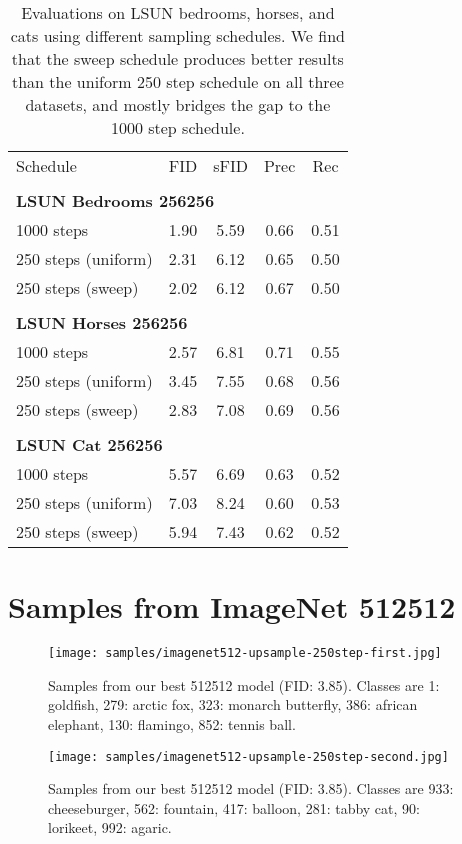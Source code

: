 \documentclass{article}
\begin{document}
\begin{table}[h]
    \begin{center}
    \begin{small}
    \begin{tabular}[t]{lcccc}
    \toprule
    Schedule & FID & sFID & Prec & Rec \\
    \\
    \multicolumn{5}{l}{\bf{LSUN Bedrooms} 256256} \\
    \toprule
    1000 steps & 1.90 & 5.59 & 0.66 & 0.51  \\
    250 steps (uniform) & 2.31 & 6.12 & 0.65 & 0.50 \\
    250 steps (sweep) & 2.02 & 6.12 & 0.67 & 0.50 \\
    \\
    \multicolumn{5}{l}{\bf{LSUN Horses} 256256} \\
    1000 steps & 2.57 & 6.81 & 0.71 & 0.55 \\
    250 steps (uniform) & 3.45 & 7.55 & 0.68 & 0.56 \\
    250 steps (sweep) & 2.83 & 7.08 & 0.69 & 0.56 \\
    \\
    \multicolumn{5}{l}{\bf{LSUN Cat} 256256} \\
    1000 steps & 5.57 & 6.69 & 0.63 & 0.52 \\
    250 steps (uniform) & 7.03 & 8.24 & 0.60 & 0.53 \\
    250 steps (sweep) & 5.94 & 7.43 & 0.62 & 0.52 \\
    \bottomrule
    \end{tabular}
    \end{small}
    \end{center}
    \caption{Evaluations on LSUN bedrooms, horses, and cats using different sampling schedules. We find that the sweep schedule produces better results than the uniform 250 step schedule on all three datasets, and mostly bridges the gap to the 1000 step schedule.}
    \label{tab:schedulesweep_all}
\end{table}

\clearpage
\section{Samples from ImageNet \texorpdfstring{512512}{512x512}}
\label{app:fullsamples}

\begin{figure}[h]
    \centerline{\texttt{[image: samples/imagenet512-upsample-250step-first.jpg]}}
    \caption{Samples from our best 512512 model (FID: 3.85). Classes are 1: goldfish, 279: arctic fox, 323: monarch butterfly, 386: african elephant, 130: flamingo, 852: tennis ball.}
    \vskip -1in
\end{figure}
\clearpage
\begin{figure}[h]
    \centerline{\texttt{[image: samples/imagenet512-upsample-250step-second.jpg]}}
    \caption{Samples from our best 512512 model (FID: 3.85). Classes are 933: cheeseburger, 562: fountain, 417: balloon, 281: tabby cat, 90: lorikeet, 992: agaric.}
    \vskip -1in
\end{figure}
\end{document}
